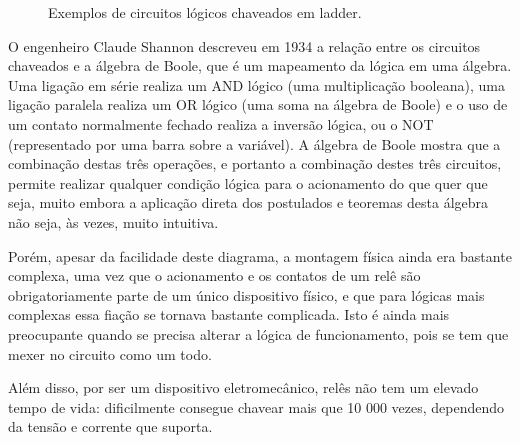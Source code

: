 \begin{figure}[!h]
  \caption{Exemplos de circuitos lógicos chaveados em ladder.}
  \label{fig:ladders}
\end{figure}

O engenheiro Claude Shannon descreveu em 1934 a relação entre os circuitos chaveados e a álgebra de Boole, que é um mapeamento da lógica em uma álgebra. Uma ligação em série realiza um $\mathrm{AND}$ lógico (uma multiplicação booleana), uma ligação paralela realiza um $\mathrm{OR}$ lógico (uma soma na álgebra de Boole) e o uso de um contato normalmente fechado realiza a inversão lógica, ou o $\mathrm{NOT}$ (representado por uma barra sobre a variável). A álgebra de Boole mostra que a combinação destas três operações, e portanto a combinação destes três circuitos, permite realizar qualquer condição lógica para o acionamento do que quer que seja, muito embora a aplicação direta dos postulados e teoremas desta álgebra não seja, às vezes, muito intuitiva.

Porém, apesar da facilidade deste diagrama, a montagem física ainda era bastante complexa, uma vez que o acionamento e os contatos de um relê são obrigatoriamente parte de um único dispositivo físico, e que para lógicas mais complexas essa fiação se tornava bastante complicada. Isto é ainda mais preocupante quando se precisa alterar a lógica de funcionamento, pois se tem que mexer no circuito como um todo.

Além disso, por ser um dispositivo eletromecânico, relês não tem um elevado tempo de vida: dificilmente consegue chavear mais que 10 000 vezes, dependendo da tensão e corrente que suporta.

